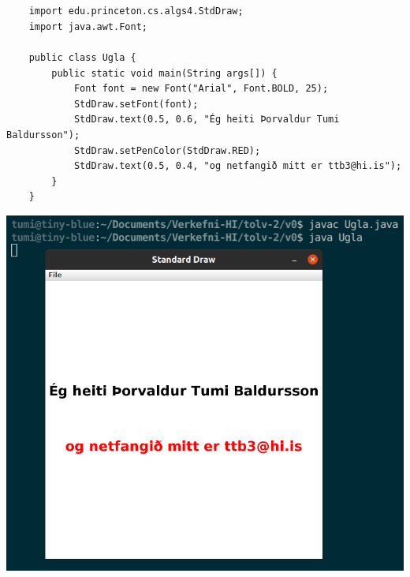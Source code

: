 \documentclass{article}
\begin{document}
\section{}
\begin{verbatim}
    import edu.princeton.cs.algs4.StdDraw;
    import java.awt.Font;

    public class Ugla {
        public static void main(String args[]) {
            Font font = new Font("Arial", Font.BOLD, 25);
            StdDraw.setFont(font);
            StdDraw.text(0.5, 0.6, "Ég heiti Þorvaldur Tumi Baldursson");
            StdDraw.setPenColor(StdDraw.RED);
            StdDraw.text(0.5, 0.4, "og netfangið mitt er ttb3@hi.is");
        }
    }
\end{verbatim}
\begin{center}
    \includegraphics[scale=0.5]{comprun.png}\\
\end{center}
\end{document}

